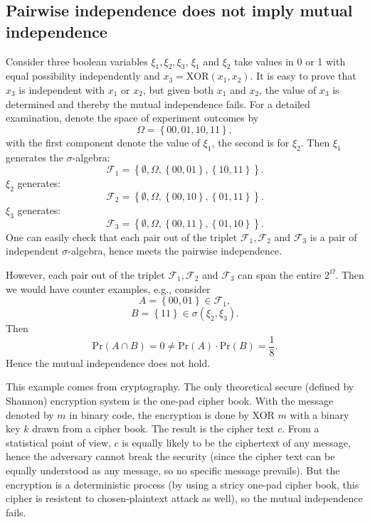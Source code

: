 \documentclass[UTF8]{ctexart}
\begin{document}
\subsection{Pairwise independence does not imply mutual independence}
Consider three boolean variables $\xi_{1},\xi_{2},\xi_{3}$, $\xi_{1}$ and $\xi_{2}$ take values in 0 or 1 with equal possibility independently and $x_{3}=\text{XOR}(x_{1},x_{2})$.
It is easy to prove that $x_{3}$ is independent with $x_{1}$ or $x_{2}$, but given both $x_{1}$ and $x_{2}$, the value of $x_{3}$ is determined and thereby the mutual independence fails.
For a detailed examination, denote the space of experiment outcomes by
$$\Omega=\left\{00,01,10,11 \right\},$$
with the first component denote the value of $\xi_{1}$, the second is for $\xi_{2}$.
Then $\xi_{1}$ generates the $\sigma$-algebra:
$$\mathcal{F}_{1}=\left\{\emptyset,\Omega,\left\{00,01\right\},\left\{10,11\right\} \right\}.$$
$\xi_{2}$ generates:
$$\mathcal{F}_{2}=\left\{\emptyset,\Omega,\left\{00,10\right\},\left\{01,11\right\} \right\}.$$
$\xi_{3}$ generates:
$$\mathcal{F}_{3}=\left\{\emptyset,\Omega,\left\{00,11\right\},\left\{01,10\right\} \right\}.$$
One can easily check that each pair out of the triplet $\mathcal{F}_{1},\mathcal{F}_{2}$ and $\mathcal{F}_{3}$ is a pair of independent $\sigma$-algebra, hence meets the pairwise independence.

However, each pair out of the triplet $\mathcal{F}_{1},\mathcal{F}_{2}$ and $\mathcal{F}_{3}$ can span the entire $2^{\Omega}$.
Then we would have counter examples, e.g., consider
$$A=\left\{00,01\right\}\in\mathcal{F}_{1},$$
$$B=\left\{11\right\}\in\sigma(\xi_{2},\xi_{3}).$$
Then
$$\text{Pr}(A\cap B)=0\neq \text{Pr}(A)\cdot\text{Pr}(B)=\frac{1}{8}.$$
Hence the mutual independence does not hold.

This example comes from cryptography.
The only theoretical secure (defined by Shannon) encryption system is the one-pad cipher book.
With the message denoted by $m$ in binary code, the encryption is done by XOR $m$ with a binary key $k$ drawn from a cipher book.
The result is the cipher text $c$.
From a statistical point of view, $c$ is equally likely to be the ciphertext of any message, hence the adversary cannot break the security (since the cipher text can be equally understood as any message, so no specific message prevails).
But the encryption is a deterministic process (by using a stricy one-pad cipher book, this cipher is resistent to chosen-plaintext attack as well), so the mutual independence fails.
\end{document}
